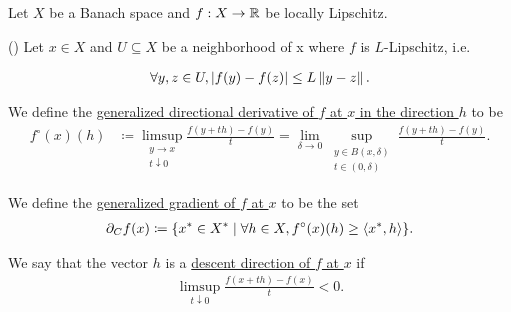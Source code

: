 Let $X$ be a Banach space and $f: X \to \mathbb{R}$ be locally Lipschitz.

\begin{definition}(\cite[195]{Clarke2013})
\label{def:analysis:nonsmooth:generalized_gradient}
  Let $x \in X$ and $U \subseteq X$ be a neighborhood of x where $f$ is $L$-Lipschitz, i.e.

  \begin{align*}
    \forall y, z \in U, \left\vert f(y) - f(z) \right\vert \leq L \left\Vert y - z \right\Vert.
  \end{align*}

  We define the \uline{generalized directional derivative of $f$ at $x$ in the direction $h$} to be
  \begin{align*}
    f^\circ(x)(h)
    &\coloneqq
    \limsup_{\substack{y \to x \\ t \downarrow 0}} \frac {f(y + th) - f(y)} t
    =
    \lim_{\delta \to 0} \sup_{\substack{y \in B(x, \delta) \\ t \in (0, \delta)}} \frac {f(y + th) - f(y)} t.
  \end{align*}

  We define the \uline{generalized gradient of $f$ at $x$} to be the set
  \begin{align*}
    \partial_C f(x) \coloneqq \{ x^* \in X^* \mid \forall h \in X, f^\circ(x)(h) \geq \left\langle x^*, h \right\rangle \}.
  \end{align*}

  We say that the vector $h$ is a \uline{descent direction of $f$ at $x$} if
  \begin{align*}
    \limsup_{t \downarrow 0} \frac {f(x + th) - f(x)} t < 0.
  \end{align*}
\end{definition}
